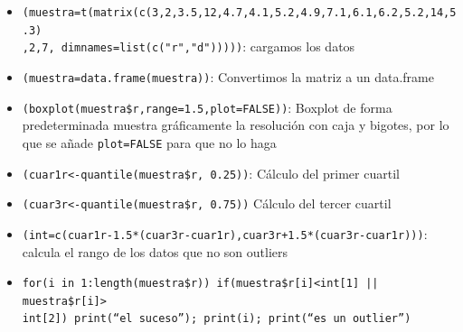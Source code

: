 \documentclass[a4paper, 12pt]{article}
\begin{document}
	\begin{itemize}
		\item \texttt{(muestra=t(matrix(c(3,2,3.5,12,4.7,4.1,5.2,4.9,7.1,6.1,6.2,5.2,14,5.3)\\,2,7, dimnames=list(c("r","d")))))}: cargamos los datos
		\item \texttt{(muestra=data.frame(muestra))}: Convertimos la matriz a un data.frame
		\item \texttt{(boxplot(muestra\$r,range=1.5,plot=FALSE))}: Boxplot de forma predeterminada muestra gráficamente la resolución con caja y bigotes, por lo que se añade \texttt{plot=FALSE} para que no lo haga
		\item \texttt{(cuar1r<-quantile(muestra\$r, 0.25))}: Cálculo del primer cuartil
		\item \texttt{(cuar3r<-quantile(muestra\$r, 0.75))} Cálculo del tercer cuartil
		\item \texttt{(int=c(cuar1r-1.5*(cuar3r-cuar1r),cuar3r+1.5*(cuar3r-cuar1r)))}: calcula el rango de los datos que no son outliers
		\item \texttt{for(i in 1:length(muestra\$r)) {if(muestra\$r[i]<int[1] || muestra\$r[i]>\\int[2]) {print(``el suceso''); print(i); print(``es un outlier'')}}}
	\end{itemize}
\end{document}
